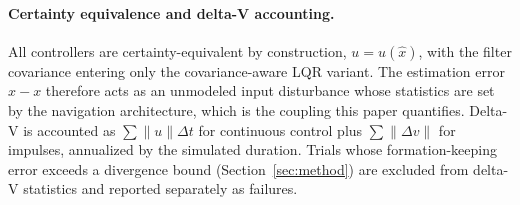 \paragraph{Certainty equivalence and delta-V accounting.}
All controllers are certainty-equivalent by construction, $u = u(\hat{x})$,
with the filter covariance entering only the covariance-aware LQR variant.
The estimation error $\hat{x} - x$ therefore acts as an unmodeled input
disturbance whose statistics are set by the navigation architecture, which
is the coupling this paper quantifies. Delta-V is accounted as
$\sum \lVert u \rVert \Delta t$ for continuous control plus
$\sum \lVert \Delta v \rVert$ for impulses, annualized by the simulated
duration. Trials whose formation-keeping error exceeds a divergence bound
(Section~\ref{sec:method}) are excluded from delta-V statistics and
reported separately as failures.
